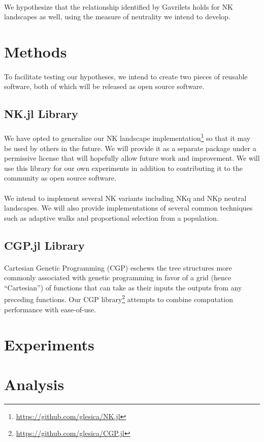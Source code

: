\documentclass[12pt,letterpaper,titlepage]{article}
\begin{document}
\paragraph{}
We hypothesize that the relationship identified by Gavrilets holds for NK
landscapes as well, using the measure of neutrality we intend to develop.

\section{Methods}

\paragraph{}
To facilitate testing our hypotheses, we intend to create two pieces of
reusable software, both of which will be released as open source software.

\subsection{NK.jl Library}

\paragraph{}
We have opted to generalize our NK landscape
implementation\footnote{\url{https://github.com/glesica/NK.jl}} so that it may
be used by others in the future. We will provide it as a separate package under
a permissive license that will hopefully allow future work and improvement.  We
will use this library for our own experiments in addition to contributing it to
the community as open source software.

\paragraph{}
We intend to implement several NK variants including NKq and NKp neutral
landscapes. We will also provide implementations of several common techniques
such as adaptive walks and proportional selection from a population.

\subsection{CGP.jl Library}

\paragraph{}
Cartesian Genetic Programming (CGP) eschews the tree structures more commonly
associated with genetic programming in favor of a grid (hence ``Cartesian'') of
functions that can take as their inputs the outputs from any preceding
functions. Our CGP library\footnote{\url{https://github.com/glesica/CGP.jl}}
attempts to combine computation performance with ease-of-use.

\section{Experiments}

\section{Analysis}


{}
\end{document}
